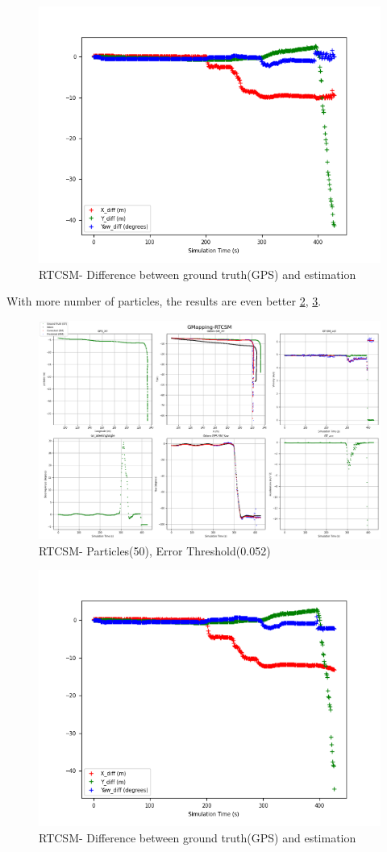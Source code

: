     \begin{figure}[h] 
        \includegraphics[height=0.4\textwidth]{images/GMapping-RTCSM_True_vs_Crct_20_0.052.png}
        \caption{RTCSM- Difference between ground truth(GPS) and estimation}
        \label{fig:RTCSM_20_0.052_diff}
    \end{figure}
\clearpage
With more number of particles, the results are even better \ref{fig:RTCSM_50_0.052}, \ref{fig:RTCSM_50_0.052_diff}.
    \begin{figure}[h] 
        \includegraphics[height=0.6\textwidth]{images/GMapping-RTCSM_Map_50_0.052.png}
        \caption{RTCSM- Particles(50), Error Threshold(0.052)}
        \label{fig:RTCSM_50_0.052}
    \end{figure}
    \begin{figure}[h] 
        \includegraphics[height=0.4\textwidth]{images/GMapping-RTCSM_True_vs_Crct_50_0.052.png}
        \caption{RTCSM- Difference between ground truth(GPS) and estimation}
        \label{fig:RTCSM_50_0.052_diff}
    \end{figure}
\clearpage


